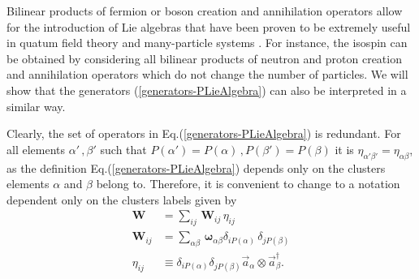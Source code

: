 \documentclass[twocolumn,aps,sort,nofootinbib]{revtex4}
\begin{document}
Bilinear products of fermion or boson creation and annihilation operators
allow for the introduction of Lie algebras that have been proven to be
extremely useful in quatum field theory and many-particle systems \cite{Lipkin65}. 
For instance, the isospin can be obtained by considering all
bilinear products of neutron and proton creation and annihilation 
operators which do not change the number of particles. We will show
that the generators (\ref{generators-PLieAlgebra}) can also be 
interpreted in a similar way. 

Clearly, the set of operators in Eq.(\ref{generators-PLieAlgebra}) is redundant.
For all elements 
$\alpha'\,,\beta'$ such that $P(\alpha')=P(\alpha)\,,P(\beta')=P(\beta)$ it is
$\eta_{\alpha'\beta'}=\eta_{\alpha\beta}$, as the definition Eq.(\ref{generators-PLieAlgebra})
depends only on the clusters elements $\alpha$ and $\beta$ belong to.
Therefore, it is convenient to change to a notation dependent only on the clusters
labels given by
\begin{subequations}
\begin{align}
\boldsymbol{W} &= \sum_{ij}\,\boldsymbol{W}_{ij}\,\eta_{ij} \\
\boldsymbol{W}_{ij} &= 
 \sum_{\alpha\beta}\,\boldsymbol{\omega}_{\alpha\beta}\delta_{iP(\alpha)}\,\delta_{jP(\beta)} \\
\eta_{ij} &\equiv \delta_{iP(\alpha)}\delta_{jP(\beta)}
 \overrightarrow{a}_\alpha\otimes\overrightarrow{a}_\beta^\dagger.
\end{align}
\label{CanonicalGeneratorsPLieAlgebra}
\end{subequations}
\end{document}
